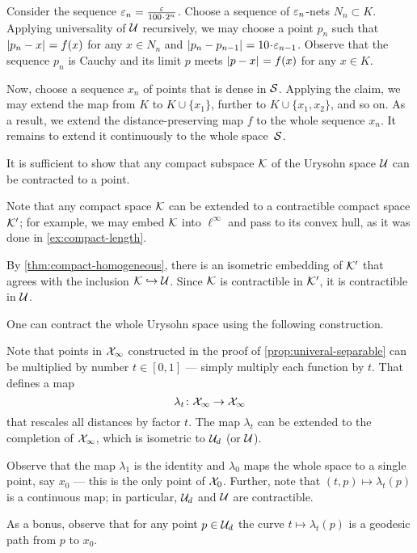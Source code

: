Consider the sequence $\eps_n=\tfrac\eps{100\cdot 2^n}$.
Choose a sequence of $\varepsilon_n$-nets $N_n\subset K$.
Applying universality of $\mathcal{U}$ recursively, we may choose a point $p_n$ such that $\dist{p_n}{x}{}=f(x)$ for any $x\in N_n$ and $\dist{p_n}{p_{n-1}}{}\z=10\cdot\eps_{n-1}$.
Observe that the sequence $p_n$ is Cauchy and its limit $p$ meets 
$\dist{p}{x}{}=f(x)$ for any $x\in K$.

Now, choose a sequence $x_n$ of points that is dense in $\mathcal{S}$.
Applying the claim, we may extend the map from $K$ to $K\cup\{x_1\}$, further to $K\cup\{x_1,x_2\}$, and so on.
As a result, we extend the distance-preserving map $f$ to the whole sequence $x_n$.
It remains to extend it continuously to the whole space~$\mathcal{S}$.

It is sufficient to show that any compact subspace $\mathcal{K}$ of the Urysohn space $\mathcal{U}$ can be contracted to a point.

Note that any compact space $\mathcal{K}$ can be extended to a contractible compact space $\mathcal{K}'$; for example, we may embed $\mathcal{K}$ into $\ell^\infty$ and pass to its convex hull, as it was done in \ref{ex:compact-length}.

By \ref{thm:compact-homogeneous}, there is an isometric embedding of $\mathcal{K}'$ that agrees with the inclusion $\mathcal{K}\hookrightarrow\mathcal{U}$.
Since $\mathcal{K}$ is contractible in $\mathcal{K}'$, it is contractible in $\mathcal{U}$.

One can contract the whole Urysohn space using the following construction.

Note that points in $\mathcal{X}_\infty$ constructed in the proof of \ref{prop:univeral-separable} can be multiplied by number $t\in [0,1]$ --- simply multiply each function by $t$.
That defines a map 
\[\lambda_t\colon\mathcal{X}_\infty\to \mathcal{X}_\infty\]
that rescales all distances by factor $t$.
The map $\lambda_t$ can be extended to the completion of $\mathcal{X}_\infty$, which is isometric to $\mathcal{U}_d$ (or $\mathcal{U}$).

Observe that 
the map $\lambda_1$ is the identity  and $\lambda_0$ maps the whole space to a single point, say $x_0$ --- this is the only point of $\mathcal{X}_0$.
Further, note that $(t,p)\mapsto \lambda_t(p)$ is a continuous map; in particular, $\mathcal{U}_d$ and $\mathcal{U}$ are contractible.

As a bonus, observe that for any point $p\in \mathcal{U}_d$ the curve $t\mapsto \lambda_t(p)$ is a geodesic path from $p$ to $x_0$.

